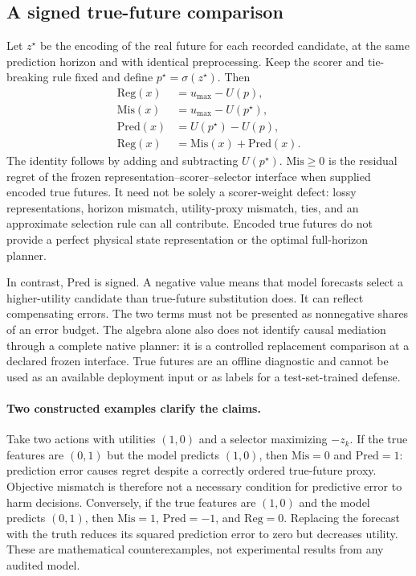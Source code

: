 {\subsection{A signed true-future comparison}
Let $z^\star$ be the encoding of the real future for each recorded
candidate, at the same prediction horizon and with identical preprocessing.
Keep the scorer and tie-breaking rule fixed and define
$p^\star=\sigma(z^\star)$. Then
\begin{align}
 \mathrm{Reg}(x)&=u_{\max}-U(p),\nonumber\\
 \mathrm{Mis}(x)&=u_{\max}-U(p^\star),\nonumber\\
 \mathrm{Pred}(x)&=U(p^\star)-U(p),\nonumber\\
 \mathrm{Reg}(x)&=\mathrm{Mis}(x)+\mathrm{Pred}(x).
 \label{eq:decomposition}
\end{align}
The identity follows by adding and subtracting $U(p^\star)$.
$\mathrm{Mis}\geq0$ is the residual regret of the frozen
representation--scorer--selector interface when supplied encoded true
futures. It need not be solely a scorer-weight defect: lossy representations,
horizon mismatch, utility-proxy mismatch, ties, and an approximate selection
rule can all contribute. Encoded true futures do not provide a perfect
physical state representation or the optimal full-horizon planner.

In contrast, $\mathrm{Pred}$ is signed. A negative value means that model
forecasts select a higher-utility candidate than true-future substitution
does. It can reflect compensating errors. The two terms must not be
presented as nonnegative shares of an error budget. The algebra alone also
does not identify causal mediation through a complete native planner:
it is a controlled replacement comparison at a declared frozen interface.
True futures are an offline diagnostic and cannot be used as an available
deployment input or as labels for a test-set-trained defense.

\paragraph{Two constructed examples clarify the claims.}
Take two actions with utilities $(1,0)$ and a selector maximizing $-z_k$.
If the true features are $(0,1)$ but the model predicts $(1,0)$, then
$\mathrm{Mis}=0$ and $\mathrm{Pred}=1$: prediction error causes regret
despite a correctly ordered true-future proxy. Objective mismatch is
therefore not a necessary condition for predictive error to harm decisions.
Conversely, if the true features are $(1,0)$ and the model predicts
$(0,1)$, then $\mathrm{Mis}=1$, $\mathrm{Pred}=-1$, and
$\mathrm{Reg}=0$. Replacing the forecast with the truth reduces its squared
prediction error to zero but decreases utility. These are mathematical
counterexamples, not experimental results from any audited model.

}
